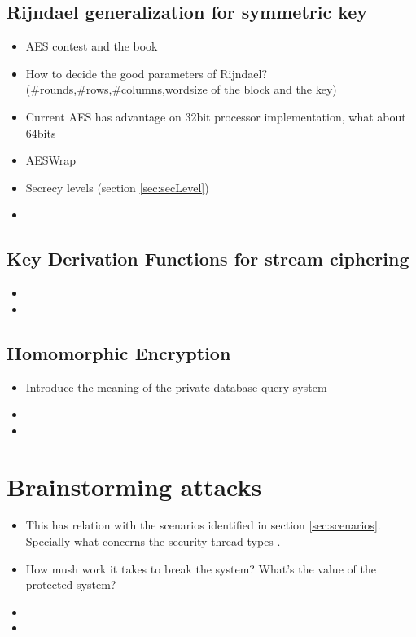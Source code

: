 \documentclass[10pt,a4paper,twoside]{llncs}
\begin{document}
%
\subsection{Rijndael generalization for symmetric key \label{sec:gRijndael}}

\begin{itemize}
    \item AES contest \cite{AES-FIPS} and the book \cite{Daemen:2002:DR:560131}
    \item How to decide the good parameters of Rijndael? (\#rounds,\#rows,\#columns,wordsize of the block and the key) \cite{gRijndael}
    \item Current AES has advantage on 32bit processor implementation, what about 64bits
    \item AESWrap \cite{rfc3394}
    \item Secrecy levels (section \ref{sec:secLevel})
    \item 
\end{itemize}

%
\subsection{Key Derivation Functions for stream ciphering \label{sec:kdfStreaming}}

\begin{itemize}
    \item 
    \item 
\end{itemize}

%
\subsection{Homomorphic Encryption \label{sec:Homorph}}

\begin{itemize}
    \item Introduce the meaning of the private database query system \cite{iacr422}
    \item 
    \item 
\end{itemize}

%
\section{Brainstorming attacks \label{sec:attacks}}

\begin{itemize}
    \item This has relation with the scenarios identified in section \ref{sec:scenarios}. Specially what concerns the security thread types \cite{SecEngRossAnderson}.
    \item How mush work it takes to break the system? What's the value of the protected system?
    \item 
    \item
\end{itemize}
\end{document}
